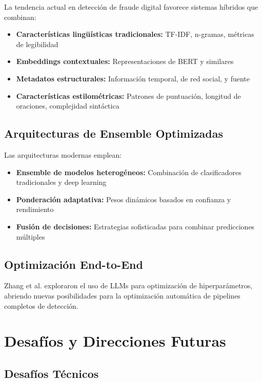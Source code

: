 La tendencia actual en detección de fraude digital favorece sistemas híbridos que combinan:
\begin{itemize}
    \item \textbf{Características lingüísticas tradicionales:} TF-IDF, n-gramas, métricas de legibilidad
    \item \textbf{Embeddings contextuales:} Representaciones de BERT y similares
    \item \textbf{Metadatos estructurales:} Información temporal, de red social, y fuente
    \item \textbf{Características estilométricas:} Patrones de puntuación, longitud de oraciones, complejidad sintáctica
\end{itemize}

\subsection{Arquitecturas de Ensemble Optimizadas}

Las arquitecturas modernas emplean:
\begin{itemize}
    \item \textbf{Ensemble de modelos heterogéneos:} Combinación de clasificadores tradicionales y deep learning
    \item \textbf{Ponderación adaptativa:} Pesos dinámicos basados en confianza y rendimiento
    \item \textbf{Fusión de decisiones:} Estrategias sofisticadas para combinar predicciones múltiples
\end{itemize}

\subsection{Optimización End-to-End}

Zhang et al. \cite{zhang2023using} exploraron el uso de LLMs para optimización de hiperparámetros, abriendo nuevas posibilidades para la optimización automática de pipelines completos de detección.

\section{Desafíos y Direcciones Futuras}
\label{sec:desafios_direcciones}

\subsection{Desafíos Técnicos}

